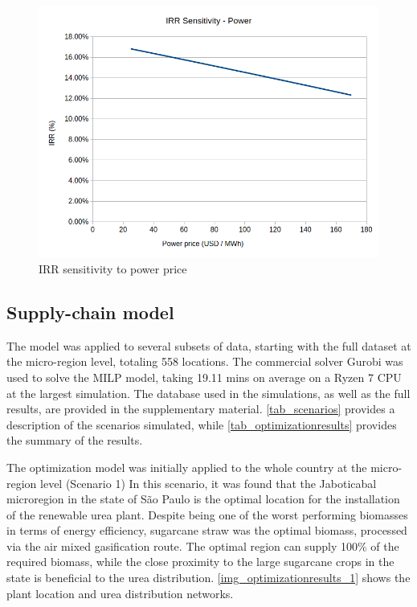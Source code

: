 \documentclass[a4paper, titlepage]{article}
\begin{document}
\begin{figure}
	\includegraphics[width=\textwidth]{img/fig_IRRsensitivity_power.png}
	\caption{IRR sensitivity to power price}
	\label{img_IRRsens_power}
\end{figure}

\subsection{Supply-chain model}

The model was applied to several subsets of data, starting with the full dataset at the micro-region level, totaling
558 locations. The commercial solver Gurobi was used to solve the MILP model, taking 19.11 mins on average on a Ryzen 7 CPU at the 
largest simulation. The database used in the simulations, as well as the full results, are provided in the
supplementary material. \autoref{tab_scenarios} provides a description of the scenarios simulated, while 
\autoref{tab_optimizationresults} provides the summary of the results.

The optimization model was initially applied to the whole country at the micro-region level (Scenario 1) In this
scenario, it was found that the Jaboticabal microregion in the state of São Paulo is the optimal location for the installation of the renewable urea plant. Despite being one of the worst performing biomasses in terms of energy efficiency, sugarcane straw was the
optimal biomass, processed via the air mixed gasification route. The optimal region can supply 100\% of the required biomass,
while the close proximity to the large sugarcane crops in the state is beneficial to the urea distribution. 
 \autoref{img_optimizationresults_1} shows the plant location and urea distribution networks.
\end{document}
